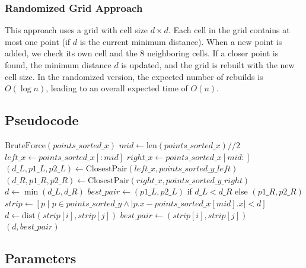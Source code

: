 \subsubsection*{Randomized Grid Approach}

This approach uses a grid with cell size $d \times d$. Each cell in the grid contains at most one point (if $d$ is the current minimum distance). When a new point is added, we check its own cell and the 8 neighboring cells. If a closer point is found, the minimum distance $d$ is updated, and the grid is rebuilt with the new cell size. In the randomized version, the expected number of rebuilds is $O(\log n)$, leading to an overall expected time of $O(n)$.



\subsection{Pseudocode}

\begin{algorithm}[htbp]
\caption{Divide-and-Conquer Closest Pair}
\label{alg:closest_pair}
\begin{algorithmic}[1]
    \State \Return $\text{BruteForce}(points\_sorted\_x)$
  \EndIf
  \State $mid \gets \text{len}(points\_sorted\_x) // 2$
  \State $left\_x \gets points\_sorted\_x[:mid]$
  \State $right\_x \gets points\_sorted\_x[mid:]$
  \State $(d\_L, p1\_L, p2\_L) \gets \text{ClosestPair}(left\_x, points\_sorted\_y\_left)$
  \State $(d\_R, p1\_R, p2\_R) \gets \text{ClosestPair}(right\_x, points\_sorted\_y\_right)$
  \State $d \gets \min(d\_L, d\_R)$
  \State $best\_pair \gets (p1\_L, p2\_L)$ if $d\_L < d\_R$ else $(p1\_R, p2\_R)$
  \State $strip \gets [p \mid p \in points\_sorted\_y \wedge |p.x - points\_sorted\_x[mid].x| < d]$
        \State $d \gets \text{dist}(strip[i], strip[j])$
        \State $best\_pair \gets (strip[i], strip[j])$
      \EndIf
    \EndFor
  \EndFor
  \State \Return $(d, best\_pair)$
\EndFunction
\end{algorithmic}
\end{algorithm}

\subsection{Parameters}

